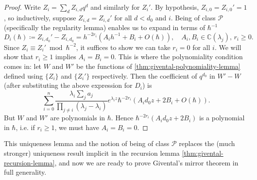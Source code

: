\documentclass{report}
\theoremstyle{plain}
\theoremstyle{definition}
\theoremstyle{remark}
\newcommand{\bC}{\mathbb{C}}
\newcommand{\cP}{\mathcal{P}}
\begin{document}
\begin{proof}
  Write $Z_i = \sum_d Z_{i,d} q^d$ and similarly for $Z_i'$. By
  hypothesis, $Z_{i,0} = Z_{i,0}' = 1$, so inductively, suppose
  $Z_{i,d} = Z_{i,d}'$ for all $d < d_0$ and $i$. Being of class $\cP$
  (specifically the regularity lemma) enables us to expand in terms of
  $\hbar^{-1}$
  \[ D_i(\hbar) \coloneqq Z_{i,d_0}' - Z_{i,d_0} = h^{-2r_i}(A_i h^{-1} + B_i + O(\hbar)), \quad A_i, B_i \in \bC(\lambda_j), \, r_i \ge 0. \]
  Since $Z_i \equiv Z_i' \bmod{\hbar^{-2}}$, it suffices to show we
  can take $r_i = 0$ for all $i$. We will show that $r_i \ge 1$
  implies $A_i = B_i = 0$. This is where the polynomiality condition
  comes in: let $W$ and $W'$ be the functions of
  \ref{thm:givental-polynomiality-lemma} defined using $\{Z_i\}$ and
  $\{Z_i'\}$ respectively. Then the coefficient of $q^{d_0}$ in $W' -
  W$ (after substituting the above expression for $D_i$) is
  \[ \sum_{i=0}^n \frac{\lambda_i \sum_j a_j}{\prod_{j \neq i} (\lambda_j - \lambda_i)} e^{\lambda_i z}\hbar^{-2r_i} (A_i d_0 z + 2 B_i + O(\hbar)). \]
  But $W$ and $W'$ are polynomials in $\hbar$. Hence
  $\hbar^{-2r_i}(A_id_0z + 2B_i)$ is a polynomial in $\hbar$, i.e. if
  $r_i \ge 1$, we must have $A_i = B_i = 0$.
\end{proof}

This uniqueness lemma and the notion of being of class $\cP$ replaces
the (much stronger) uniqueness result implicit in the recursion lemma
\ref{thm:givental-recursion-lemma}, and now we are ready to prove
Givental's mirror theorem in full generality.
\end{document}
